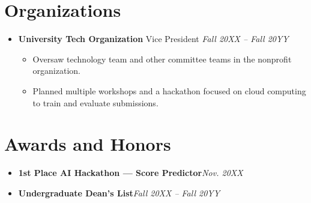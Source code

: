 \documentclass[letterpaper, 10pt]{article}
\newcommand{\job}[4]{\textbf{#1} #2 \hfill\textit{#3}#4}
\newcommand{\award}[2]{\textbf{#1}\hfill\textit{#2}}
\begin{document}
\section{Organizations}%
\begin{itemize}[leftmargin=0pt]
    \item[]
        \job
        {University Tech Organization}
        {Vice President}
        {Fall 20XX -- Fall 20YY}
        {\begin{itemize}
            \item Oversaw technology team and other committee teams in the
                nonprofit organization.
            \item Planned multiple workshops and a hackathon focused on cloud
                computing to train and evaluate submissions.
        \end{itemize}
        }
\end{itemize}%
\section{Awards and Honors}%
\begin{itemize}[leftmargin=0pt]
    \item[]
        \award
        {1st Place AI Hackathon --- Score Predictor}
        {Nov. 20XX}
    \item[]
        \award
        {Undergraduate Dean's List} %
        {Fall 20XX -- Fall 20YY}
\end{itemize}%
\end{document}
